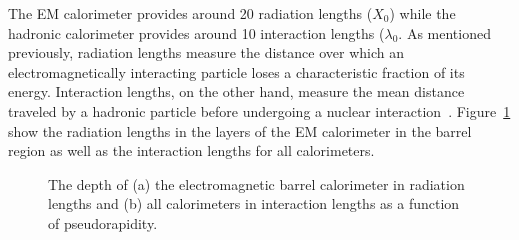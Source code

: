 The \ac{EM} calorimeter provides around 20 radiation lengths ($X_0$) while the hadronic calorimeter provides around 10 interaction lengths ($\lambda_0$. 
As mentioned previously, radiation lengths measure the distance over which an electromagnetically interacting particle loses a characteristic fraction of its energy.
Interaction lengths, on the other hand, measure the mean distance traveled by a hadronic particle before undergoing a nuclear interaction~\cite{pdg}.
Figure~\ref{fig:calo_interactionlengths} show the radiation lengths in the layers of the \ac{EM} calorimeter in the barrel region as well as the interaction lengths for all calorimeters.


\begin{figure}[hbtp]
\caption{The depth of (a) the electromagnetic barrel calorimeter in radiation lengths and (b) all calorimeters in interaction lengths as a function of pseudorapidity.}
\label{fig:calo_interactionlengths}
\end{figure}

